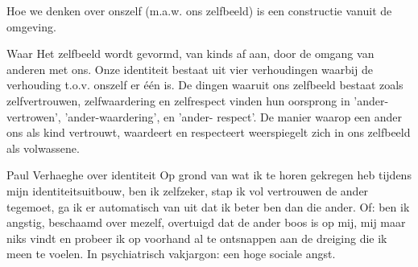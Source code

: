 \documentclass[main.tex]{subfiles}
\begin{document}
\begin{examenvraag}
    \begin{stelling}
        Hoe we denken over onszelf (m.a.w. ons zelfbeeld) is een constructie vanuit de omgeving.
    \end{stelling}

    \begin{stelling-antwoord}{Waar}
        Het zelfbeeld wordt gevormd, van kinds af aan, door de omgang van 
        anderen met ons.
        Onze identiteit bestaat uit vier verhoudingen waarbij de verhouding 
        t.o.v.‭ ‬onszelf er één is.‭ ‬De dingen waaruit ons zelfbeeld bestaat 
        zoals zelfvertrouwen,‭ ‬zelfwaardering en zelfrespect vinden hun 
        oorsprong in‭ '‬ander-vertrowen‭'‬,‭ '‬ander-waardering‭'‬,‭ ‬en‭ '‬ander-
        respect‭'‬.‭ ‬De manier waarop een ander ons als kind vertrouwt,‭ 
        ‬waardeert en respecteert weerspiegelt zich in ons zelfbeeld als volwassene.
        \begin{citaat}{Paul Verhaeghe over identiteit}
            Op grond van wat ik te horen gekregen heb tijdens mijn identiteitsuitbouw, ben ik zelfzeker, stap ik vol vertrouwen de ander tegemoet, ga ik er automatisch van uit dat ik beter ben dan die ander.
            Of: ben ik angstig, beschaamd over mezelf, overtuigd dat de ander boos is op mij, mij maar niks vindt en probeer ik op voorhand al te ontsnappen aan de dreiging die ik meen te voelen. In psychiatrisch vakjargon: een hoge sociale angst.
        \end{citaat}
    \end{stelling-antwoord}
\end{examenvraag}
\end{document}
